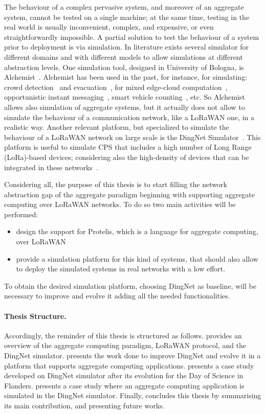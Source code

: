 The behaviour of a complex pervasive system, and moreover of an aggregate system, cannot be tested on a single machine; at the same time, testing in the real world is usually inconvenient, complex, and expensive, or even straightforwardly impossible.
A partial solution to test the behaviour of a system prior to deployment is via simulation.
In literature exists several simulator for different domains and with different models to allow simulations at different abstraction levels.
One simulation tool, designed in University of Bologna, is Alchemist~\cite{PianiniJOS2013}.
Alchemist has been used in the past, for instance, for simulating: crowd detection~\cite{FGCS2017, TOMACS2018} and evacuation~\cite{DBLP:journals/corr/abs-1711-08297}, for mixed edge-cloud computation~\cite{Coordination2019-sgcg}, opportunistic instant messaging~\cite{Coordination2019-processes}, smart vehicle counting~\cite{Viroli2016}, etc.
So Alchemist allows also simulation of aggregate systems, but it actually does not allow to simulate the behaviour of a communication network, like a LoRaWAN one, in a realistic way.
Another relevant platform, but specialized to simulate the behaviour of a LoRaWAN network on large scale is the DingNet Simulator~\cite{inproceedings}.
This platform is useful to simulate CPS that includes a high number of Long Range (LoRa)-based devices; considering also the high-density of devices that can be integrated in these networks~\cite{Lavric2019}. 

Considering all, the purpose of this thesis is to start filling the network abstraction gap of the aggregate paradigm beginning with supporting aggregate computing over LoRaWAN networks.
To do so two main activities will be performed: 
\begin{itemize}
    \item design the support for Protelis, which is a language for aggregate computing, over LoRaWAN
    \item provide a simulation platform for this kind of systems,
    that should also allow to deploy the simulated systems in real networks with a low effort.
\end{itemize}
To obtain the desired simulation platform, choosing DingNet as baseline, will be necessary to improve and evolve it adding all the needed functionalities. 

%
\paragraph{Thesis Structure.} %
Accordingly, the reminder of this thesis is structured as follows.
%
 provides an overview of the aggregate computing paradigm, \mbox{LoRaWAN} protocol, and the DingNet simulator.
%
 presents the work done to improve DingNet and evolve it in a platform that supports aggregate computing applications.
%
 presents a case study developed on DingNet simulator after its evolution for the Day of Science in Flanders.
% 
 presents a case study where an aggregate computing application is simulated in the DingNet simulator.
% 
Finally,  concludes this thesis by summarising its main contribution, and presenting future works.